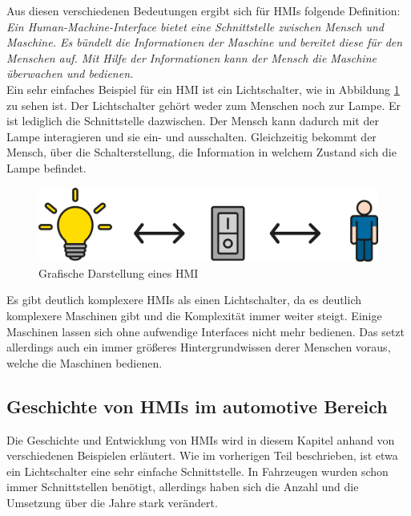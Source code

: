 Aus diesen verschiedenen Bedeutungen ergibt sich für \aclp{HMI} folgende Definition:\\

\textit{
Ein Human-Machine-Interface bietet eine Schnittstelle zwischen Mensch und Maschine. Es bündelt die Informationen der Maschine und bereitet diese für den Menschen auf. Mit Hilfe der Informationen kann der Mensch die Maschine überwachen und bedienen.}\\

Ein sehr einfaches Beispiel für ein \ac{HMI} ist ein Lichtschalter, wie in Abbildung \ref{fig:gra_hmi} zu sehen ist. Der Lichtschalter gehört weder zum Menschen noch zur Lampe. Er ist lediglich die Schnittstelle dazwischen. Der Mensch kann dadurch mit der Lampe interagieren und sie ein- und ausschalten. Gleichzeitig bekommt der Mensch, über die Schalterstellung, die Information in welchem Zustand sich die Lampe befindet. \cite{wiki_schnittstelle}\\

\begin{figure}[htb]
	\centering
	\includegraphics[width=13.5cm]{img/1_einleitung/HMI_Farbe}
	\caption{Grafische Darstellung eines \ac{HMI}}
	\label{fig:gra_hmi}
\end{figure}

Es gibt deutlich komplexere \acp{HMI} als einen Lichtschalter, da es deutlich komplexere Maschinen gibt und die Komplexität immer weiter steigt. Einige Maschinen lassen sich ohne aufwendige Interfaces nicht mehr bedienen. Das setzt allerdings auch ein immer größeres Hintergrundwissen derer Menschen voraus, welche die Maschinen bedienen.\\

\subsection{Geschichte von HMIs im automotive Bereich}
Die Geschichte und Entwicklung von \acp{HMI} wird in diesem Kapitel anhand von verschiedenen Beispielen erläutert. Wie im vorherigen Teil beschrieben, ist etwa ein Lichtschalter eine sehr einfache Schnittstelle. In Fahrzeugen wurden schon immer Schnittstellen benötigt, allerdings haben sich die Anzahl und die Umsetzung über die Jahre stark verändert.\\

